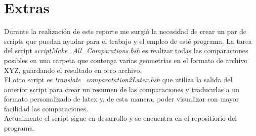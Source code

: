 \documentclass[12pt]{article}
\begin{document}




\section{Extras}

Durante la realización de este reporte me surgió la necesidad de crear un par de scripts que puedan ayudar para el trabajo y 
el empleo de esté programa. La tarea del script {\it scriptMake\_All\_Comparations.bsh} es realizar todas las comparaciones 
posibles en una carpeta que contenga varias geometrías en el formato de archivo XYZ, guardando el resultado en otro archivo.\\
El otro script es {\it translate\_comparatation2Latex.bsh} que utiliza la salida del anterior script para crear un resumen de las comparaciones 
y traducirlas a un formato personalizado de latex y, de esta manera, poder visualizar con mayor facilidad las comparaciones.\\
Actualmente el script sigue en desarrollo y se encuentra en el repositiorio del programa.
\end{document}
